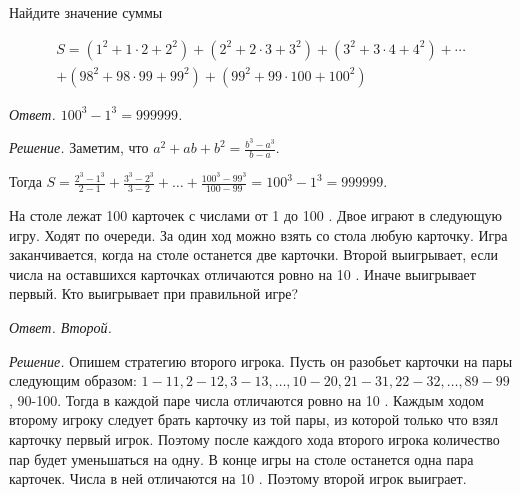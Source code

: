 Найдите значение суммы

$$
\begin{gathered}
S=\left(1^2+1 \cdot 2+2^2\right)+\left(2^2+2 \cdot 3+3^2\right)+\left(3^2+3 \cdot 4+4^2\right)+\cdots \\
+\left(98^2+98 \cdot 99+99^2\right)+\left(99^2+99 \cdot 100+100^2\right)
\end{gathered}
$$

\textit{Ответ. $100^3-1^3=999999$.}

\textit{Решение.}
Заметим, что $a^2+a b+b^2=\frac{b^3-a^3}{b-a}$.

Тогда $S=\frac{2^3-1^3}{2-1}+\frac{3^3-2^3}{3-2}+\ldots+\frac{100^3-99^3}{100-99}=100^3-1^3=999999$.

На столе лежат 100 карточек с числами от 1 до 100 . Двое играют в следующую игру. Ходят по очереди. За один ход можно взять со стола любую карточку. Игра заканчивается, когда на столе останется две карточки. Второй выигрывает, если числа на оставшихся карточках отличаются ровно на 10 . Иначе выигрывает первый. Кто выигрывает при правильной игре?

\textit{Ответ. Второй.}

\textit{Решение.}
Опишем стратегию второго игрока. Пусть он разобьет карточки на пары следующим образом: $1-11,2-12,3-13, \ldots, 10-20,21-31,22-32, \ldots, 89-99$, 90-100. Тогда в каждой паре числа отличаются ровно на 10 . Каждым ходом второму игроку следует брать карточку из той пары, из которой только что взял карточку первый игрок. Поэтому после каждого хода второго игрока количество пар будет уменьшаться на одну. В конце игры на столе останется одна пара карточек. Числа в ней отличаются на 10 . Поэтому второй игрок выиграет.